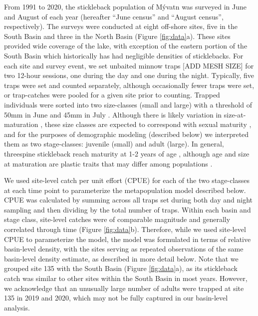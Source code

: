 \documentclass[11pt]{article}
\begin{document}
From 1991 to 2020, 
the stickleback population of M\'{y}vatn was surveyed in June and August of each year
(hereafter ``June census'' and ``August census'', respectively). 
The surveys were conducted at eight off-shore sites, 
five in the South Basin and three in the North Basin
(Figure \ref{fig:data}a).
These sites provided wide coverage of the lake,
with exception of the eastern portion of the South Basin 
which historically has had negligible densities of sticklebacks.
For each site and survey event, 
we set unbaited minnow traps [ADD MESH SIZE] for two 12-hour sessions, 
one during the day and one during the night. 
Typically, five traps were set and counted separately, 
although occasionally fewer traps were set,
or trap-catches were pooled for a given site prior to counting.
Trapped individuals were sorted into two size-classes (small and large)
with a threshold of 50mm in June and 45mm in July \citep{gislason1998}. 
Although there is likely variation in size-at-maturation \citep{singkam2019},
these size classes are expected to correspond with sexual maturity 
\citep{gudmundsson1996, gislason1998},
and for the purposes of demographic modeling (described below) 
we interpreted them as two stage-classes: juvenile (small) and adult (large).
In general, threespine stickleback reach maturity at 1-2 years of age
\citep{baker2008overview},
although age and size at maturation are plastic traits \citep{baker2015life}
that may differ among populations \citep{snyder1991migration}.

We used site-level catch per unit effort (CPUE) for each of the two stage-classes 
at each time point to parameterize the metapopulation model described below. 
CPUE was calculated by summing across all traps set during both day and night sampling
and then dividing by the total number of traps.
Within each basin and stage class, 
site-level catches were of comparable magnitude and 
generally correlated through time (Figure \ref{fig:data}b).
Therefore, while we used site-level CPUE to parameterize the model, 
the model was formulated in terms of relative basin-level density,
with the sites serving as repeated observations of the same basin-level density estimate,
as described in more detail below.
Note that we grouped site 135 with the South Basin (Figure \ref{fig:data}a), 
as its stickleback catch was similar to other sites within the South Basin in most years.
However, 
we acknowledge that an unusually large number of adults were trapped at site 135
in 2019 and 2020, which may not be fully captured in our basin-level analysis.
\end{document}

